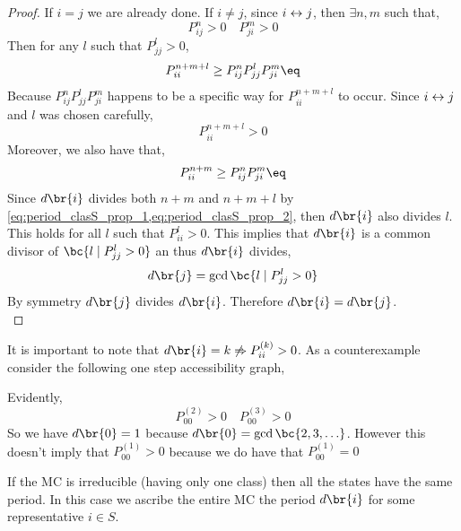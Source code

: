 \documentclass{article}
\begin{document}
\begin{proof}
If $i = j$ we are already done. If $i \neq j$, since ${i}\leftrightarrow{j}$, then $\exists n, m$ such that,
\[ P_{ij}^{n} > 0 \quad P_{ji}^{m} > 0 \]
Then for any $l$ such that $P^{l}_{jj} > 0$,
\[ P_{ii}^{n+m+l} \geq P_{ij}^{n}P_{jj}^{l}P_{ji}^{m} \eq \label{eq:period_clasS_prop_2} \]
Because $P_{ij}^{n}P_{jj}^{l}P_{ji}^{m}$ happens to be a specific way for $P_{ii}^{n+m+l}$ to occur. Since ${i}\leftrightarrow{j}$ and $l$ was chosen carefully,
\[ P_{ii}^{n+m+l} > 0 \]
Moreover, we also have that,
\[ P_{ii}^{n+m} \geq P_{ij}^{n}P_{ji}^{m} \eq \label{eq:period_clasS_prop_1}\]
Since $d\br{i}$ divides both $n+m$ and $n+m+l$ by \cref{eq:period_clasS_prop_1,eq:period_clasS_prop_2}, then $d\br{i}$ also divides $l$. This holds for all $l$ such that $P_{ii}^{l}>0$. This implies that $d\br{i}$ is a common divisor of $\bc{l \mid P_{jj}^{l} > 0}$ an thus $d\br{i}$ divides,
\[ d\br{j} = \gcd \bc{l \mid P_{jj}^{l} > 0} \]
By symmetry $d\br{j}$ divides $d\br{i}$. Therefore $d\br{i} = d\br{j}$. \\
\end{proof}

\begin{remark}
It is important to note that $d\br{i} = k \not\Rightarrow P_{ii}^{(k)} > 0$. As a counterexample consider the following one step accessibility graph,
\begin{center}
\end{center}
Evidently,
\[ P^{(2)}_{00} > 0 \quad P^{(3)}_{00} > 0 \]
So we have $d\br{0} = 1$ because $d\br{0} = \gcd\bc{2,3,\ldots}$. However this doesn't imply that $P_{00}^{(1)} > 0$ because we do have that $P^{(1)}_{00} = 0$
\end{remark}

\begin{remark}
If the MC is irreducible (having only one class) then all the states have the same period. In this case we ascribe the entire MC the period $d\br{i}$ for some representative $ i \in S$.
\end{remark}
\end{document}
